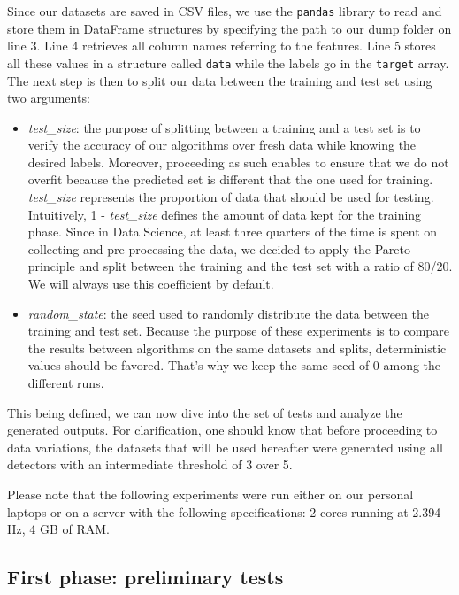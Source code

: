 Since our datasets are saved in CSV files, we use the \texttt{pandas} library to read and store them in DataFrame structures by specifying the path to our dump folder on line 3. Line 4 retrieves all column names referring to the features. Line 5 stores all these values in a structure called \texttt{data} while the labels go in the \texttt{target} array. The next step is then to split our data between the training and test set using two arguments:
\begin{itemize}
    \item \textit{test\_size}: the purpose of splitting between a training and a test set is to verify the accuracy of our algorithms over fresh data while knowing the desired labels. Moreover, proceeding as such enables to ensure that we do not overfit because the predicted set is different that the one used for training. \textit{test\_size} represents the proportion of data that should be used for testing. Intuitively, 1 - \textit{test\_size} defines the amount of data kept for the training phase. Since in Data Science, at least three quarters of the time is spent on collecting and pre-processing the data, we decided to apply the Pareto principle and split between the training and the test set with a ratio of 80/20. We will always use this coefficient by default.
    \item \textit{random\_state}: the seed used to randomly distribute the data between the training and test set. Because the purpose of these experiments is to compare the results between algorithms on the same datasets and splits, deterministic values should be favored. That's why we keep the same seed of 0 among the different runs.
\end{itemize}

This being defined, we can now dive into the set of tests and analyze the generated outputs. For clarification, one should know that before proceeding to data variations, the datasets that will be used hereafter were generated using all detectors with an intermediate threshold of 3 over 5.

Please note that the following experiments were run either on our personal laptops or on a server with the following specifications: 2 cores running at 2.394 Hz, 4 GB of RAM.

\subsection{First phase: preliminary tests} \label{first_phase}
